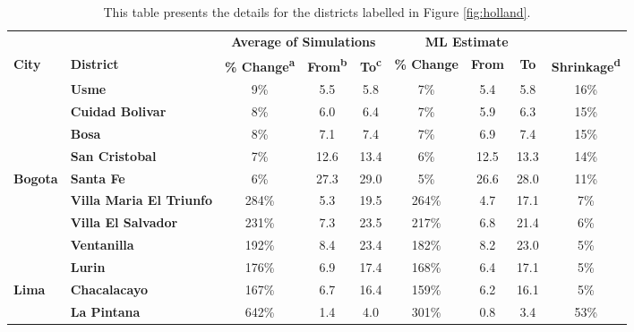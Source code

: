 \begin{table}[!h]

\caption{\label{tab:top-5}This table presents the details for the districts labelled in Figure \ref{fig:holland}.}
\centering
\fontsize{8}{10}\selectfont
\begin{tabular}[t]{>{}l>{}lccccccc}
\toprule
\multicolumn{2}{c}{\textbf{ }} & \multicolumn{3}{c}{\textbf{Average of Simulations}} & \multicolumn{3}{c}{\textbf{ML Estimate}} & \multicolumn{1}{c}{\textbf{ }} \\
\cmidrule(l{3pt}r{3pt}){3-5} \cmidrule(l{3pt}r{3pt}){6-8}
\textbf{City} & \textbf{District} & \textbf{\% Change\textsuperscript{a}} & \textbf{From\textsuperscript{b}} & \textbf{To\textsuperscript{c}} & \textbf{\% Change} & \textbf{From} & \textbf{To} & \textbf{Shrinkage\textsuperscript{d}}\\
\midrule
 & \textbf{Usme} & 9\% & 5.5 & 5.8 & 7\% & 5.4 & 5.8 & 16\%\\

 & \textbf{Cuidad Bolivar} & 8\% & 6.0 & 6.4 & 7\% & 5.9 & 6.3 & 15\%\\

 & \textbf{Bosa} & 8\% & 7.1 & 7.4 & 7\% & 6.9 & 7.4 & 15\%\\

 & \textbf{San Cristobal} & 7\% & 12.6 & 13.4 & 6\% & 12.5 & 13.3 & 14\%\\

\multirow{-5}{*}{\raggedright\arraybackslash \textbf{Bogota}} & \textbf{Santa Fe} & 6\% & 27.3 & 29.0 & 5\% & 26.6 & 28.0 & 11\%\\
\cmidrule{1-9}
 & \textbf{Villa Maria El Triunfo} & 284\% & 5.3 & 19.5 & 264\% & 4.7 & 17.1 & 7\%\\

 & \textbf{Villa El Salvador} & 231\% & 7.3 & 23.5 & 217\% & 6.8 & 21.4 & 6\%\\

 & \textbf{Ventanilla} & 192\% & 8.4 & 23.4 & 182\% & 8.2 & 23.0 & 5\%\\

 & \textbf{Lurin} & 176\% & 6.9 & 17.4 & 168\% & 6.4 & 17.1 & 5\%\\

\multirow{-5}{*}{\raggedright\arraybackslash \textbf{Lima}} & \textbf{Chacalacayo} & 167\% & 6.7 & 16.4 & 159\% & 6.2 & 16.1 & 5\%\\
\cmidrule{1-9}
 & \textbf{La Pintana} & 642\% & 1.4 & 4.0 & 301\% & 0.8 & 3.4 & 53\%\\


\end{tabular}
\end{table}
